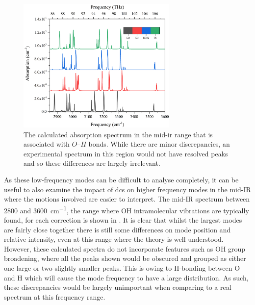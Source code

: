 \begin{figure}[!htb]
    \centering
    \includegraphics[width=0.7\textwidth]{Figures/Spectra/midIRG.png}
    \captionsetup{font = footnotesize, justification = centering}
    \caption[The Calculated Absorption Spectrum in the Frequency Range Associated with OH Bonds]{The calculated absorption spectrum in the mid\nobreakdash-\acrshort{ir} range that is associated with \(O\)\nobreakdash--\(H\) bonds. While there are minor discrepancies, an experimental spectrum in this region would not have resolved peaks and so these differences are largely irrelevant.}
    \label{fig:midIR}
\end{figure}

As these low\nobreakdash-frequency modes can be difficult to analyse completely, it can be useful to also examine the impact of \acrshort{dc}s on higher frequency modes in the mid\nobreakdash-IR where the motions involved are easier to interpret. The mid\nobreakdash-IR spectrum between 2800 and \SI{3600}{cm^{-1}}, the range where OH intramolecular vibrations are typically found, for each correction is shown in . It is clear that whilst the largest modes are fairly close together there is still some differences on mode position and relative intensity, even at this range where the theory is well understood. However, these calculated spectra do not incorporate features such as OH group broadening, where all the peaks shown would be obscured and grouped as either one large or two slightly smaller peaks. This is owing to H\nobreakdash-bonding between O and H which will cause the mode frequency to have a large distribution. As such, these discrepancies would be largely unimportant when comparing to a real spectrum at this frequency range.

